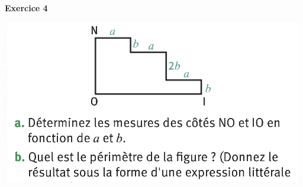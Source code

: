 \documentclass[14pt]{extreport}
\theoremstyle{plain}
\begin{document}
\textbf{Exercice 4} %

\includegraphics[scale=1.4]{exo}
 
 
 
 
 
 
 
\end{document}
